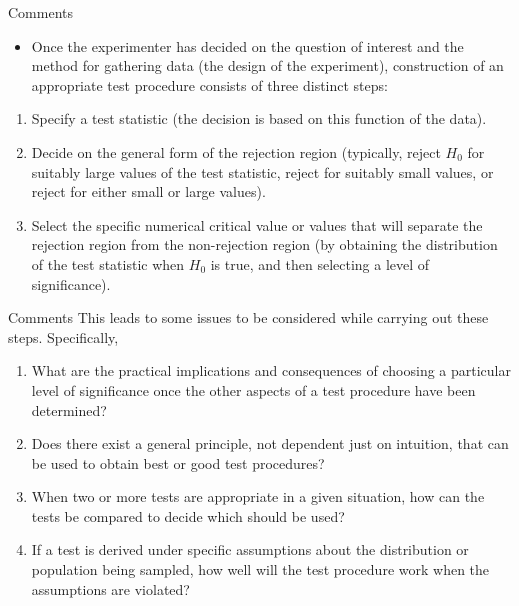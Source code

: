 \documentclass[
  ignorenonframetext,
]{beamer}
\providecommand{\tightlist}{%
  \setlength{\itemsep}{0pt}\setlength{\parskip}{0pt}}\usepackage{longtable,booktabs,array}
\begin{document}
\begin{frame}{Comments}
\protect\hypertarget{comments}{}
\begin{itemize}[<+->]
\tightlist
\item
  Once the experimenter has decided on the question of interest and the
  method for gathering data (the design of the experiment), construction
  of an appropriate test procedure consists of three distinct steps:
\end{itemize}

\begin{enumerate}[<+->]
\tightlist
\item
  Specify a test statistic (the decision is based on this function of
  the data).
\item
  Decide on the general form of the rejection region (typically, reject
  \(H_{0}\) for suitably large values of the test statistic, reject for
  suitably small values, or reject for either small or large values).
\item
  Select the specific numerical critical value or values that will
  separate the rejection region from the non-rejection region (by
  obtaining the distribution of the test statistic when \(H_{0}\) is
  true, and then selecting a level of significance).
\end{enumerate}
\end{frame}

\begin{frame}{Comments}
\protect\hypertarget{comments-1}{}
This leads to some issues to be considered while carrying out these
steps. Specifically,

\begin{enumerate}[<+->]
\tightlist
\item
  What are the practical implications and consequences of choosing a
  particular level of significance once the other aspects of a test
  procedure have been determined?
\item
  Does there exist a general principle, not dependent just on intuition,
  that can be used to obtain best or good test procedures?
\item
  When two or more tests are appropriate in a given situation, how can
  the tests be compared to decide which should be used?
\item
  If a test is derived under specific assumptions about the distribution
  or population being sampled, how well will the test procedure work
  when the assumptions are violated?
\end{enumerate}
\end{frame}
\end{document}
